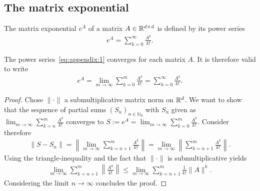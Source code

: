 \subsection{The matrix exponential}
\label{sec:matrix-exponentials}

\begin{definition}
  The matrix exponential $e^A$ of a matrix $A\in \mathbb R^{d\times d}$ is defined
  by its power series
  \begin{gather}
    \label{eq:appendix:1}
    e^A = \sum_{k=0}^\infty \frac{A^k}{k!}.
  \end{gather}
\end{definition}

\begin{lemma}
  \label{lemma:appendix:exp-0}
  The power series~\eqref{eq:appendix:1} converges for each matrix $A$. It is
  therefore valid to write
  \begin{gather}
    \label{eq:appendix:1.5}
    e^A = \lim_{m \to \infty} \sum_{k=0}^m \frac{A^k}{k!}
		= \sum_{k=0}^\infty \frac{A^k}{k!}.
  \end{gather}
\end{lemma}

\begin{proof}
  Chose $\| \cdot \|$ a submultiplicative matrix norm on $\mathbb R^d$. We want to
  show that the sequence of partial sums $(S_n)_{n \in \mathbb N_0}$ with $S_n$
  given as $\lim_{m \to \infty} \sum_{k=n} ^m \frac{A^k}{k!}$ converges to
  $S := e^A = \lim_{m \to \infty} \sum_{k=0} ^m \frac{A^k}{k!}$. Consider
  therefore
  \begin{gather}
    \|S - S_n\| = \left\| \lim_{m \to \infty} \sum_{k=n+1}^m \frac{A^k}{k!} \right\|
		= \lim_{m \to \infty} \left\| \sum_{k=n+1}^m \frac{A^k}{k!} \right\|.
  \end{gather}
  Using the triangle-inequality and the fact that $\| \cdot \|$ is submultiplicative
  yields
  \begin{gather}
  	\lim_{m \to \infty} \sum_{k=n+1}^m \left\| \frac{A^k}{k!} \right\|
		\le \lim_{m \to \infty} \sum_{k=n+1}^m \frac{1}{k!} \|A \|^k.
  \end{gather}
  Considering the limit $n \to \infty$ concludes the proof.
\end{proof}

